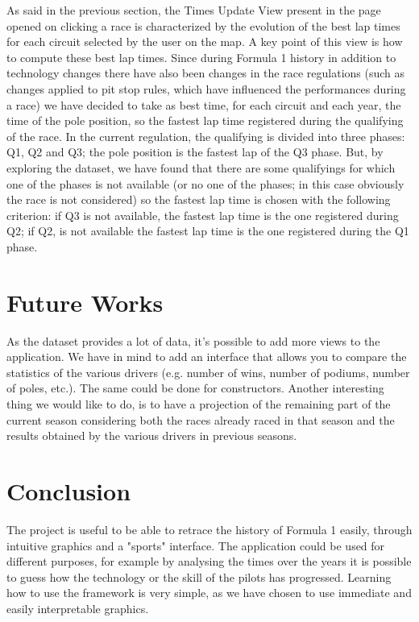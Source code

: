 \documentclass[11pt,twocolumn,letterpaper]{article}
\begin{document}
As said in the previous section, the Times Update View present in the page opened on clicking a race is characterized by the evolution of the best lap times for each circuit selected by the user on the map. A key point of this view is how to compute these best lap times. Since during Formula 1 history in addition to technology changes there have also been changes in the race regulations (such as changes applied to pit stop rules, which have influenced the performances during a race) we have decided to take as best time, for each circuit and each year, the time of the pole position, so the fastest lap time registered during the qualifying of the race. In the current regulation, the qualifying is divided into three phases: Q1, Q2 and Q3; the pole position is the fastest lap of the Q3 phase. But, by exploring the dataset, we have found that there are some qualifyings for which one of the phases is not available (or no one of the phases; in this case obviously the race is not considered) so the fastest lap time is chosen with the following criterion: if Q3 is not available, the fastest lap time is the one registered during Q2; if Q2, is not available the fastest lap time is the one registered during the Q1 phase.

\section{Future Works}
As the dataset provides a lot of data, it's possible to add more views to the application. We have in mind to add an interface that allows you to compare the statistics of the various drivers (e.g. number of wins, number of podiums, number of poles, etc.). The same could be done for constructors. Another interesting thing we would like to do, is to have a projection of the remaining part of the current season considering both the races already raced in that season and the results obtained by the various drivers in previous seasons.

\section{Conclusion}
The project is useful to be able to retrace the history of Formula 1 easily, through intuitive graphics and a "sports" interface. The application could be used for different purposes, for example by analysing the times over the years it is possible to guess how the technology or the skill of the pilots has progressed. Learning how to use the framework is very simple, as we have chosen to use immediate and easily interpretable graphics. 
\end{document}
